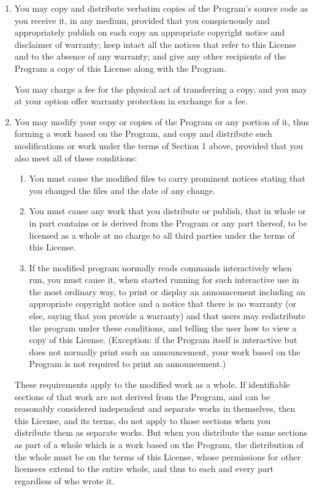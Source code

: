 \begin{lrbox}{\gpl}
\begin{minipage}{3\textwidth}
\begin{multicols}{3}
\begin{enumerate}
\item You may copy and distribute verbatim copies of the Program's source
  code as you receive it, in any medium, provided that you conspicuously
  and appropriately publish on each copy an appropriate copyright notice
  and disclaimer of warranty; keep intact all the notices that refer to
  this License and to the absence of any warranty; and give any other
  recipients of the Program a copy of this License along with the Program.

You may charge a fee for the physical act of transferring a copy, and you
may at your option offer warranty protection in exchange for a fee.

\item
You may modify your copy or copies of the Program or any portion
of it, thus forming a work based on the Program, and copy and
distribute such modifications or work under the terms of Section 1
above, provided that you also meet all of these conditions:

\begin{enumerate}

\item
You must cause the modified files to carry prominent notices stating that
you changed the files and the date of any change.

\item
You must cause any work that you distribute or publish, that in
whole or in part contains or is derived from the Program or any
part thereof, to be licensed as a whole at no charge to all third
parties under the terms of this License.

\item
If the modified program normally reads commands interactively
when run, you must cause it, when started running for such
interactive use in the most ordinary way, to print or display an
announcement including an appropriate copyright notice and a
notice that there is no warranty (or else, saying that you provide
a warranty) and that users may redistribute the program under
these conditions, and telling the user how to view a copy of this
License.  (Exception: if the Program itself is interactive but
does not normally print such an announcement, your work based on
the Program is not required to print an announcement.)

\end{enumerate}


These requirements apply to the modified work as a whole.  If
identifiable sections of that work are not derived from the Program,
and can be reasonably considered independent and separate works in
themselves, then this License, and its terms, do not apply to those
sections when you distribute them as separate works.  But when you
distribute the same sections as part of a whole which is a work based
on the Program, the distribution of the whole must be on the terms of
this License, whose permissions for other licensees extend to the
entire whole, and thus to each and every part regardless of who wrote it.


\end{enumerate}
\end{multicols}
\end{minipage}
\end{lrbox}
